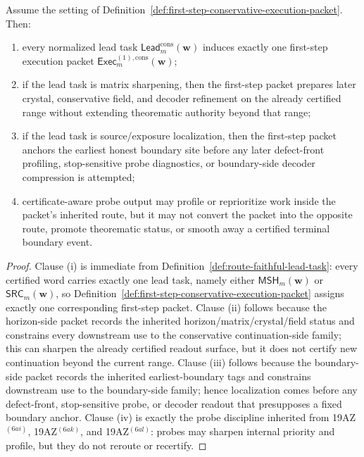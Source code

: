 \begin{proposition}
\label{prop:every-normalized-lead-task-induces-exactly-one-first-step-conservative-execution-packet}
Assume the setting of Definition~\ref{def:first-step-conservative-execution-packet}. Then:
\begin{enumerate}[label=(\roman*)]
  \item every normalized lead task \(\mathsf{Lead}^{\mathrm{cons}}_{m}(\mathbf w)\) induces exactly one first-step execution packet \(\mathsf{Exec}^{(1),\mathrm{cons}}_{m}(\mathbf w)\);
  \item if the lead task is matrix sharpening, then the first-step packet prepares later crystal, conservative field, and decoder refinement on the already certified range without extending theorematic authority beyond that range;
  \item if the lead task is source/exposure localization, then the first-step packet anchors the earliest honest boundary site before any later defect-front profiling, stop-sensitive probe diagnostics, or boundary-side decoder compression is attempted;
  \item certificate-aware probe output may profile or reprioritize work inside the packet's inherited route, but it may not convert the packet into the opposite route, promote theorematic status, or smooth away a certified terminal boundary event.
\end{enumerate}
\end{proposition}

\begin{proof}
Clause (i) is immediate from Definition~\ref{def:route-faithful-lead-task}: every certified word carries exactly one lead task, namely either \(\mathsf{MSH}_{m}(\mathbf w)\) or \(\mathsf{SRC}_{m}(\mathbf w)\), so Definition~\ref{def:first-step-conservative-execution-packet} assigns exactly one corresponding first-step packet. Clause (ii) follows because the horizon-side packet records the inherited horizon/matrix/crystal/field status and constrains every downstream use to the conservative continuation-side family; this can sharpen the already certified readout surface, but it does not certify new continuation beyond the current range. Clause (iii) follows because the boundary-side packet records the inherited earliest-boundary tags and constrains downstream use to the boundary-side family; hence localization comes before any defect-front, stop-sensitive probe, or decoder readout that presupposes a fixed boundary anchor. Clause (iv) is exactly the probe discipline inherited from 19AZ$^{(6ai)}$, 19AZ$^{(6ak)}$, and 19AZ$^{(6al)}$: probes may sharpen internal priority and profile, but they do not reroute or recertify.
\end{proof}

